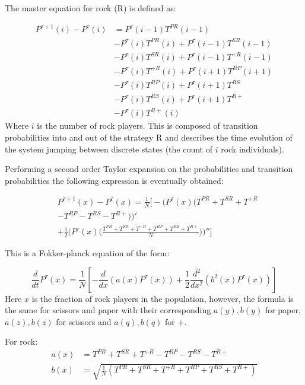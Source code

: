 \documentclass[%
 reprint,
 amsmath,amssymb,
 aps,
]{revtex4-2}
\begin{document}
The master equation \cite{alma9933506044604871} for rock (R) is defined as:

\begin{align}
P^{\tau + 1}(i) - P^\tau(i) &= P^\tau(i-1)T^{PR}(i-1) \nonumber\\
& - P^\tau(i)T^{PR}(i) + P^\tau(i-1)T^{SR}(i-1) \nonumber\\
& - P^\tau(i)T^{SR}(i) + P^\tau(i-1)T^{+R}(i-1) \nonumber\\
& - P^\tau(i)T^{+R}(i) + P^\tau(i+1)T^{RP}(i+1) \nonumber\\
&- P^\tau(i)T^{RP}(i) + P^\tau(i+1)T^{RS} \nonumber \\
&- P^\tau(i)T^{RS}(i) + P^\tau(i+1)T^{R+} \nonumber\\
&- P^\tau(i)T^{R+}(i)
\end{align}
Where $i$ is the number of rock players.
This is composed of transition probabilities into and out of the 
strategy R and describes the time evolution of the system 
jumping between discrete states (the count of $i$ rock individuals).


Performing a second order Taylor expansion on the probabilities and 
transition probabilities the following expression is eventually obtained:

\begin{align}
&P^{\tau+1}(x)-P^\tau(x) = \frac{1}{N}\Big[
    -\big(P^\tau(x)\big(
          T^{PR} + T^{SR} + T^{+R} \nonumber \\
        &- T^{RP} - T^{RS} - T^{R+}
      \big)\big)'
\nonumber \\[6pt]
 &+ \frac{1}{2}\big(
      P^\tau(x)\big(\frac{T^{PR}+T^{SR}+T^{+R}
       + T^{RP} +T^{RS}+T^{R+}}{N}\big)
    \big)'' \Big]
\end{align}


This is a Fokker-planck equation of the form:

\begin{equation}
\frac{d}{dt}P^\tau(x)
=
\frac{1}{N}
\left[
-\frac{d}{dx}\!\left(a(x)P^\tau(x)\right)
+ \frac{1}{2}\frac{d^2}{dx^2}\!\left(b^2(x)P^\tau(x)\right)
\right]
\end{equation}
Here $x$ is the fraction of rock players in the population, however, 
the formula is the same for scissors and paper with 
their corresponding $a(y), b(y)$ for paper,
$a(z), b(z)$ for scissors and $a(q), b(q)$ for $+$.

For rock:
\begin{equation} \nonumber
\begin{aligned}
a(x) &= T^{PR} + T^{SR} + T^{+R}
       - T^{RP} - T^{RS} - T^{R+} \\
b(x) &= \sqrt{\frac{1}{N}
\left(
T^{PR} + T^{SR} + T^{+R}
+ T^{RP} + T^{RS} + T^{R+}
\right)}
\end{aligned}
\end{equation}
\end{document}
